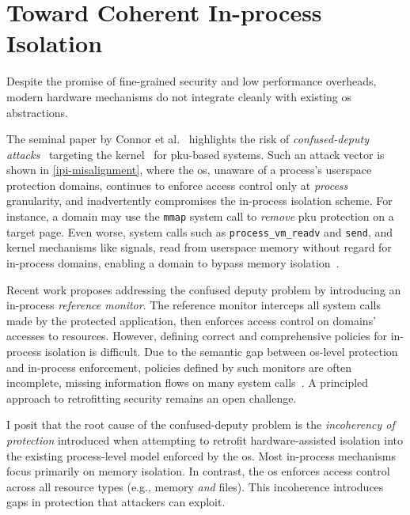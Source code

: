 \section{Toward Coherent In-process Isolation}

Despite the promise of fine-grained security and low performance overheads, modern hardware mechanisms do not integrate cleanly with existing \gls{os} abstractions.


The seminal paper by Connor et al.~\cite{pku-pitfalls} highlights the risk of \emph{confused-deputy attacks}~\cite{hardy_confused_1988} targeting the kernel~\cite{pku-pitfalls} for \gls{pku}-based systems.
Such an attack vector is shown in \autoref{ipi-misalignment}, where the \gls{os}, unaware of a process's userspace protection domains, continues to enforce access control only at \emph{process} granularity, and inadvertently compromises the in-process isolation scheme.
For instance, a domain may use the \texttt{mmap} system call to \emph{remove} \gls{pku} protection on a target page.
Even worse, system calls such as \texttt{process\_vm\_readv} and \texttt{send}, and kernel mechanisms like signals, read from userspace memory without regard for in-process domains, enabling a domain to bypass memory isolation~\cite{pku-pitfalls,yang2025endokernel}.

Recent work proposes addressing the confused deputy problem by introducing an in-process \emph{reference monitor}.
The reference monitor interceps all system calls made by the protected application, then enforces access control on domains' accesses to resources.
However, defining correct and comprehensive policies for in-process isolation is difficult.
Due to the semantic gap between \gls{os}-level protection and in-process enforcement, policies defined by such monitors are often incomplete, missing information flows on many system calls~\cite{yang2025endokernel,schrammel2022jenny}.
A principled approach to retrofitting security remains an open challenge.

I posit that the root cause of the confused-deputy problem is the \emph{incoherency of protection} introduced when attempting to retrofit hardware-assisted isolation into the existing process-level model enforced by the \gls{os}.
Most in-process mechanisms focus primarily on memory isolation. 
In contrast, the \gls{os} enforces access control across all resource types (e.g., memory \emph{and} files).
This incoherence introduces gaps in protection that attackers can exploit.

